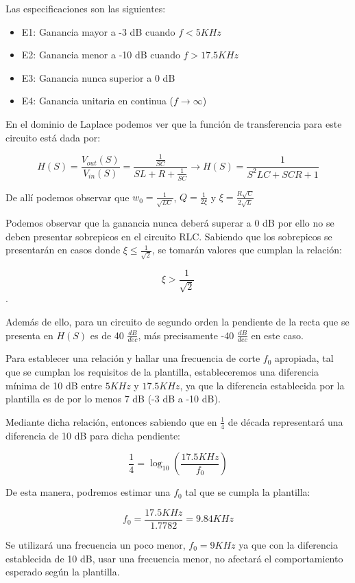 Las especificaciones son las siguientes:

\begin{itemize}
	\item E1: Ganancia mayor a -3 dB cuando $f < 5 KHz$ 
	\item E2: Ganancia menor a -10 dB cuando $f > 17.5 KHz $
	\item E3: Ganancia nunca superior a 0 dB
	\item E4: Ganancia unitaria en continua ($f \to \infty$)
\end{itemize}

En el dominio de Laplace podemos ver que la función de transferencia para este circuito está dada por:

$$H(S)=\frac{V_{out}(S)}{V_{in}(S)}=\frac{\frac{1}{SC}}{SL+R+\frac{1}{SC}} \longrightarrow 
H(S)=\frac{1}{S^2LC+SCR+1}$$

De allí podemos observar que $w_0=\frac{1}{\sqrt{LC}}$, $Q=\frac{1}{2\xi}$ y $\xi=\frac{R\sqrt{C}}{2\sqrt{L}}$

Podemos observar que la ganancia nunca deberá superar a 0 dB por ello no se deben presentar sobrepicos en el circuito RLC.
Sabiendo que los sobrepicos se presentarán en casos donde $\xi \leq \frac{1}{\sqrt{2}}$, se tomarán valores que cumplan la relación:

$$\xi > \frac{1}{\sqrt{2}}$$.

Además de ello, para un circuito de segundo orden la pendiente de la recta que se presenta en $H(S)$ es de 
40 $\frac{dB}{dec}$, más precisamente -40 $\frac{dB}{dec}$ en este caso. 

Para establecer una relación y hallar una frecuencia de corte $f_0$ apropiada, tal que se cumplan los requisitos
de la plantilla, estableceremos una diferencia mínima de 10 dB entre $5 KHz$ y $17.5 KHz$, ya que la diferencia establecida por la plantilla
es de por lo menos 7 dB (-3 dB a -10 dB).

Mediante dicha relación, entonces sabiendo que en $\frac{1}{4}$ de década representará una diferencia de 10 dB para dicha pendiente:

$$\frac{1}{4}=\log_{10}(\frac{17.5KHz}{f_0})$$

De esta manera, podremos estimar una $f_0$ tal que se cumpla la plantilla:

$$f_0 = \frac{17.5KHz}{1.7782} = 9.84 KHz$$

Se utilizará una frecuencia un poco menor, $f_0=9 KHz$ ya que con la diferencia establecida de 10 dB, usar una frecuencia menor, no afectará el comportamiento 
esperado según la plantilla.

